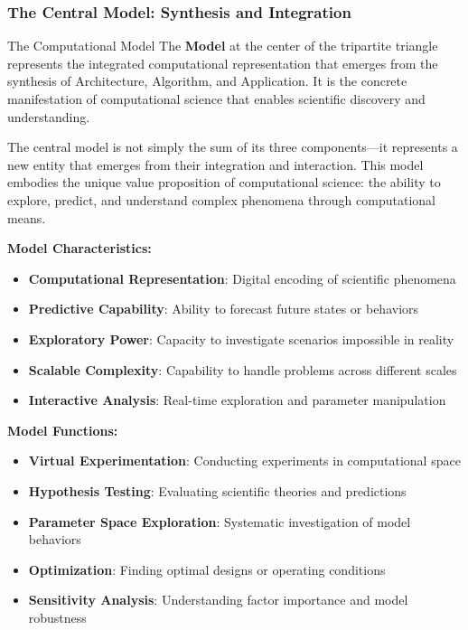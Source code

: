 \subsubsection{The Central Model: Synthesis and Integration}

\begin{conceptcard}{The Computational Model}
The \textbf{Model} at the center of the tripartite triangle represents the integrated computational representation that emerges from the synthesis of Architecture, Algorithm, and Application. It is the concrete manifestation of computational science that enables scientific discovery and understanding.
\end{conceptcard}

The central model is not simply the sum of its three components—it represents a new entity that emerges from their integration and interaction. This model embodies the unique value proposition of computational science: the ability to explore, predict, and understand complex phenomena through computational means.

\textbf{Model Characteristics:}
\begin{itemize}
    \item \textbf{Computational Representation}: Digital encoding of scientific phenomena
    \item \textbf{Predictive Capability}: Ability to forecast future states or behaviors
    \item \textbf{Exploratory Power}: Capacity to investigate scenarios impossible in reality
    \item \textbf{Scalable Complexity}: Capability to handle problems across different scales
    \item \textbf{Interactive Analysis}: Real-time exploration and parameter manipulation
\end{itemize}

\textbf{Model Functions:}
\begin{itemize}
    \item \textbf{Virtual Experimentation}: Conducting experiments in computational space
    \item \textbf{Hypothesis Testing}: Evaluating scientific theories and predictions
    \item \textbf{Parameter Space Exploration}: Systematic investigation of model behaviors
    \item \textbf{Optimization}: Finding optimal designs or operating conditions
    \item \textbf{Sensitivity Analysis}: Understanding factor importance and model robustness
\end{itemize}

